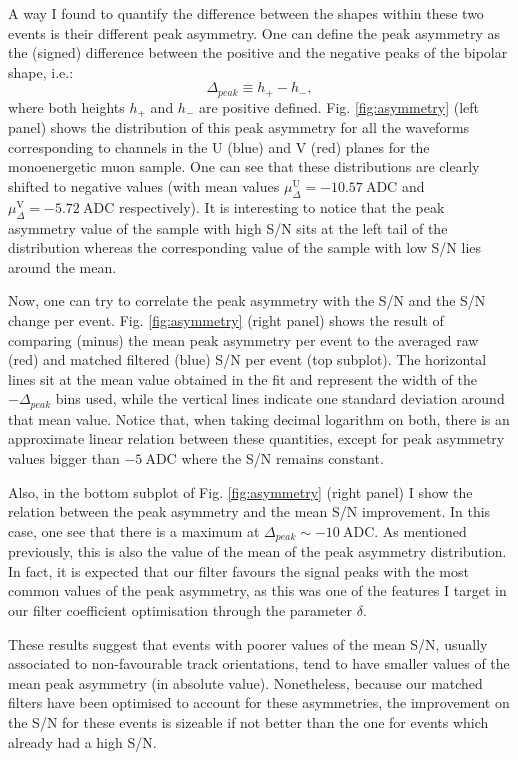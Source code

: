 A way I found to quantify the difference between the shapes within these two events is their different peak asymmetry. One can define the peak asymmetry as the (signed) difference between the positive and the negative peaks of the bipolar shape, i.e.:
\begin{equation}
\Delta_{peak} \equiv h_{+} - h_{-},
\end{equation}
where both heights $h_{+}$ and $h_{-}$ are positive defined. Fig. \ref{fig:asymmetry} (left panel) shows the distribution of this peak asymmetry for all the waveforms corresponding to channels in the U (blue) and V (red) planes for the monoenergetic muon sample. One can see that these distributions are clearly shifted to negative values (with mean values $\mu_{\Delta}^{\mathrm{U}} = -10.57 \ \mathrm{ADC}$ and $\mu_{\Delta}^{\mathrm{V}} = -5.72 \ \mathrm{ADC}$ respectively). It is interesting to notice that the peak asymmetry value of the sample with high S/N sits at the left tail of the distribution whereas the corresponding value of the sample with low S/N lies around the mean.

Now, one can try to correlate the peak asymmetry with the S/N and the S/N change per event. Fig. \ref{fig:asymmetry} (right panel) shows the result of comparing (minus) the mean peak asymmetry per event to the averaged raw (red) and matched filtered (blue) S/N per event (top subplot). The horizontal lines sit at the mean value obtained in the fit and represent the width of the $-\Delta_{peak}$ bins used, while the vertical lines indicate one standard deviation around that mean value. Notice that, when taking decimal logarithm on both, there is an approximate linear relation between these quantities, except for peak asymmetry values bigger than $- 5 \ \mathrm{ADC}$ where the S/N remains constant.

Also, in the bottom subplot of Fig. \ref{fig:asymmetry} (right panel) I show the relation between the peak asymmetry and the mean S/N improvement. In this case, one see that there is a maximum at $\Delta_{peak} \sim -10 \ \mathrm{ADC}$. As mentioned previously, this is also the value of the mean of the peak asymmetry distribution. In fact, it is expected that our filter favours the signal peaks with the most common values of the peak asymmetry, as this was one of the features I target in our filter coefficient optimisation through the parameter $\delta$.

These results suggest that events with poorer values of the mean S/N, usually associated to non-favourable track orientations, tend to have smaller values of the mean peak asymmetry (in absolute value). Nonetheless, because our matched filters have been optimised to account for these asymmetries, the improvement on the S/N for these events is sizeable if not better than the one for events which already had a high S/N.


